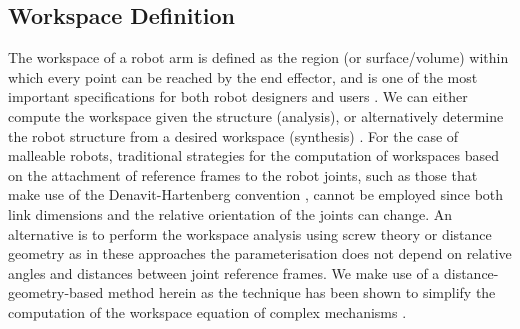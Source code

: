 \subsection{Workspace Definition}\label{sec:mr_work}
The workspace of a robot arm is defined as the region (or surface/volume) within which every point can be reached by the end effector, and is one of the most important specifications for both robot designers and users \cite{tsai-algorithm}. We can either compute the workspace given the structure (analysis), or alternatively determine the robot structure from a desired workspace (synthesis) \cite{gupta-design}. For the case of malleable robots, traditional strategies for the computation of workspaces based on the attachment of reference frames to the robot joints, such as those that make use of the Denavit-Hartenberg convention \cite{kung2005development, li2011design}, cannot be employed since both link dimensions and the relative orientation of the joints can change. An alternative is to perform the workspace analysis using screw theory \cite{coppola20146, xie2015design} or distance geometry \cite{rojas-thesis} as in these approaches the parameterisation does not depend on relative angles and distances between joint reference frames. We make use of a distance-geometry-based method herein as the technique has been shown to simplify the computation of the workspace equation of complex mechanisms \cite{rojas2016coupler, rojas-peaucellier}.


